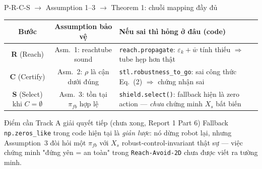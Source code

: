 \documentclass[aspectratio=169]{beamer}
\begin{document}
\begin{frame}[t,shrink=8]{P-R-C-S $\to$ Assumption 1--3 $\to$ Theorem 1: chuỗi mapping đầy đủ}
\footnotesize
\begin{center}
\begin{tabular}{c|c|l}
\textbf{Bước} & \textbf{Assumption bảo vệ} & \textbf{Nếu sai thì hỏng ở đâu (code)} \\ \hline
\textbf{R} (Reach) & Asm.~1: reachtube sound & \texttt{reach.propagate}: $\varepsilon_k+\bar w$ tính thiếu $\Rightarrow$ tube hẹp hơn thật \\
\textbf{C} (Certify) & Asm.~2: $\rho$ là cận dưới đúng & \texttt{stl.robustness\_to\_go}: sai công thức Eq.~(2) $\Rightarrow$ chứng nhận sai \\
\textbf{S} (Select) khi $C=\emptyset$ & Asm.~3: tồn tại $\pi_{fb}$ hợp lệ & \texttt{shield.select()}: fallback hiện là zero action --- \emph{chưa} chứng minh $X_s$ bất biến \\
\end{tabular}
\end{center}
\vspace{6pt}
\begin{alertblock}{Điểm cần Track A giải quyết tiếp (chưa xong, Report 1 Part 6)}
Fallback \texttt{np.zeros\_like} trong code hiện tại là \emph{giản lược}: nó dừng robot lại, nhưng Assumption~3 đòi hỏi một $\pi_{fb}$ với $X_s$ robust-control-invariant thật sự --- việc chứng minh "đứng yên = an toàn" trong \texttt{Reach-Avoid-2D} chưa được viết ra tường minh.
\end{alertblock}
\end{frame}
\end{document}
